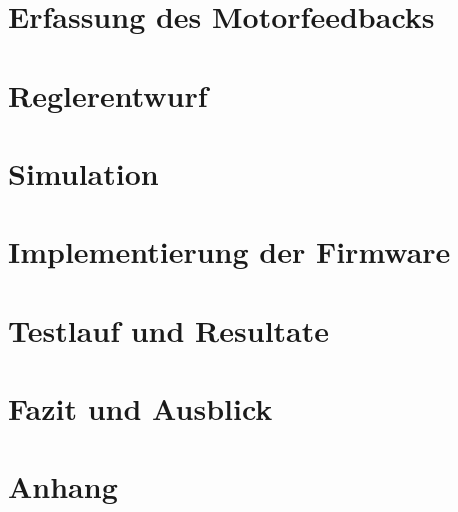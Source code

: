 \documentclass[12pt,a4paper,oneside]{report}
\begin{document}
\chapter{Erfassung des Motorfeedbacks}\label{Kap:Feedback}

\bigskip


\chapter{Reglerentwurf}\label{Kap:Regler}

\bigskip


\chapter{Simulation}\label{Kap:Simulation}

\bigskip


\chapter{Implementierung der Firmware}\label{Kap:Firmware}

\bigskip

\chapter{Testlauf und Resultate}\label{Kap:Testlauf}

\bigskip

\chapter{Fazit und Ausblick}\label{Kap:Fazit}



\cleardoublepage


\chapter{Anhang}
\end{document}
